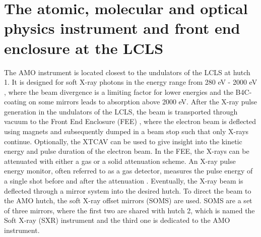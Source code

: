 \section[The AMO instrument and FEE at the LCLS]{The atomic, molecular and optical physics instrument and front end enclosure at the LCLS}\label{sec:amo-instrument}
The AMO instrument is located closest to the undulators of the LCLS at hutch 1. It is designed for soft X-ray photons in the energy range from 280 eV - 2000 eV \citep{Ferguson-2015-JSR,Bozek-2009-EPJST}, where the beam divergence is a limiting factor for lower energies and the B4C-coating on some mirrors leads to absorption above 2000 eV. After the X-ray pulse generation in the undulators of the LCLS, the beam is transported through vacuum to the Front End Enclosure (FEE) \citep{Moeller-2011-NIMPR}, where the electron beam is deflected using magnets and subsequently dumped in a beam stop such that only X-rays continue. Optionally, the XTCAV \citep{Behrens-2014-NatCom} can be used to give insight into the kinetic energy and pulse duration of the electron beam. In the FEE, the X-rays can be attenuated with either a gas or a solid attenuation scheme. An X-ray pulse energy monitor, often referred to as a gas detector, measures the pulse energy of a single shot before and after the attenuation \citep{Hau-Riege-2010-PRL-2}. Eventually, the X-ray beam is deflected through a mirror system into the desired hutch. To direct the beam to the AMO hutch, the soft X-ray offset mirrors (SOMS) are used. SOMS are a set of three mirrors, where the first two are shared with hutch 2, which is named the Soft X-ray (SXR) instrument \citep{Schlotter-2012-RSI,Soufli-2012-AppOpt,Dakovski-2015-JSR} and the third one is dedicated to the AMO instrument.
